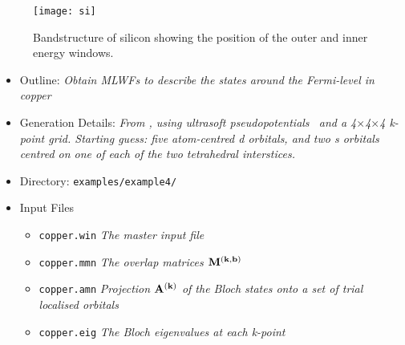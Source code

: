 \documentclass[a4paper,11pt,twoside]{article}
\begin{document}
\begin{figure}[h]
\begin{center}
\texttt{[image: si]}
\caption{Bandstructure of silicon showing the position of the outer
  and inner energy windows.} 
\label{fig:si.bnd}
\end{center}
\end{figure}




\begin{itemize}
\item{Outline: \it{Obtain MLWFs to describe the states around the
    Fermi-level in copper}} 
\item{Generation Details: \it{From \pwscf, using ultrasoft
    pseudopotentials~\cite{vanderbilt-prb90} and a
    4$\times$4$\times$4 k-point grid. Starting guess: five 
    atom-centred d orbitals, and two s orbitals centred on one of each
    of the two tetrahedral interstices.}}
\item{Directory: {\tt examples/example4/}}
\item{Input Files}
\begin{itemize}
\item{ {\tt copper.win}  {\it The master input file}}
\item{ {\tt copper.mmn}  {\it The overlap matrices $\mathbf{M}^{(\mathbf{k},\mathbf{b})}$}}
\item{ {\tt copper.amn}  {\it Projection $\mathbf{A}^{(\mathbf{k})}$ of the Bloch states onto a
    set of trial localised orbitals}} 
\item{ {\tt copper.eig}  {\it The Bloch eigenvalues at each k-point}}
\end{itemize}

\end{itemize}
\end{document}
